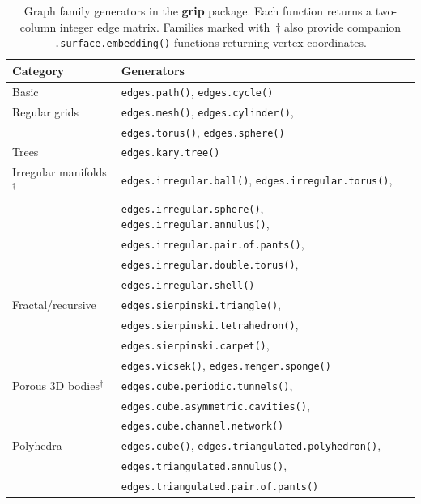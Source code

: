 \begin{table}[ht]
\centering
\caption{Graph family generators in the \textbf{grip} package. Each
function returns a two-column integer edge matrix. Families marked
with~$\dagger$ also provide companion \texttt{.surface.embedding()}
functions returning vertex coordinates.}
\label{tab:families}
\begin{tabular}{ll}
\toprule
Category & Generators \\
\midrule
Basic & \texttt{edges.path()}, \texttt{edges.cycle()} \\
Regular grids & \texttt{edges.mesh()}, \texttt{edges.cylinder()}, \\
              & \texttt{edges.torus()}, \texttt{edges.sphere()} \\
Trees & \texttt{edges.kary.tree()} \\
Irregular manifolds$^\dagger$ & \texttt{edges.irregular.ball()}, \texttt{edges.irregular.torus()}, \\
                               & \texttt{edges.irregular.sphere()}, \texttt{edges.irregular.annulus()}, \\
                               & \texttt{edges.irregular.pair.of.pants()}, \\
                               & \texttt{edges.irregular.double.torus()}, \\
                               & \texttt{edges.irregular.shell()} \\
Fractal/recursive & \texttt{edges.sierpinski.triangle()}, \\
                  & \texttt{edges.sierpinski.tetrahedron()}, \\
                  & \texttt{edges.sierpinski.carpet()}, \\
                  & \texttt{edges.vicsek()}, \texttt{edges.menger.sponge()} \\
Porous 3D bodies$^\dagger$ & \texttt{edges.cube.periodic.tunnels()}, \\
                            & \texttt{edges.cube.asymmetric.cavities()}, \\
                            & \texttt{edges.cube.channel.network()} \\
Polyhedra & \texttt{edges.cube()}, \texttt{edges.triangulated.polyhedron()}, \\
          & \texttt{edges.triangulated.annulus()}, \\
          & \texttt{edges.triangulated.pair.of.pants()} \\
\bottomrule
\end{tabular}
\end{table}

